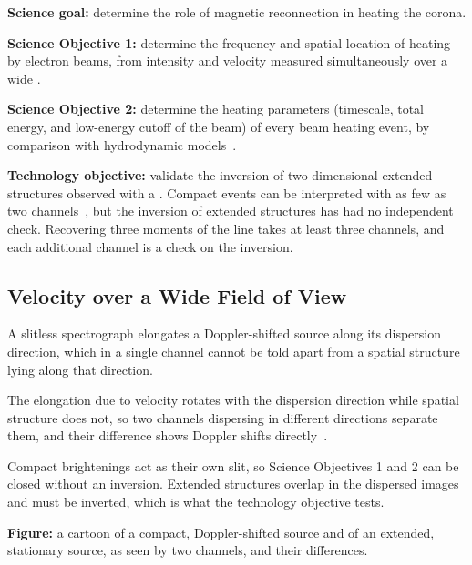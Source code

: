 \begin{outline}
\item \textbf{Science goal:} determine the role of magnetic reconnection in heating the corona.
\item \textbf{Science Objective 1:} determine the frequency and spatial location of heating by
    electron beams, from intensity and velocity measured simultaneously over a wide \FOV.
\item \textbf{Science Objective 2:} determine the heating parameters (timescale, total energy, and
    low-energy cutoff of the beam) of every beam heating event, by comparison with hydrodynamic
    models~\citep{Testa2023}.
\item \textbf{Technology objective:} validate the inversion of two-dimensional extended structures
    observed with a \CTIS.
    Compact events can be interpreted with as few as two channels~\citep{Fox2011,Parker2022}, but
    the inversion of extended structures has had no independent check.
    Recovering three moments of the line takes at least three channels, and each additional channel
    is a check on the inversion.
\end{outline}

%
\subsection{Velocity over a Wide Field of View}%
\label{subsec:VelocityoveraWideFieldofView}%

\begin{outline}
\item A slitless spectrograph elongates a Doppler-shifted source along its dispersion direction,
    which in a single channel cannot be told apart from a spatial structure lying along that
    direction.
\item The elongation due to velocity rotates with the dispersion direction while spatial structure
    does not, so two channels dispersing in different directions separate them, and their
    difference shows Doppler shifts directly~\citep[][Figures 9--11]{Parker2022}.
\item Compact brightenings act as their own slit, so Science Objectives 1 and 2 can be closed
    without an inversion.
    Extended structures overlap in the dispersed images and must be inverted, which is what the
    technology objective tests.
\item \textbf{Figure:} a cartoon of a compact, Doppler-shifted source and of an extended, stationary
    source, as seen by two channels, and their differences.
\end{outline}

